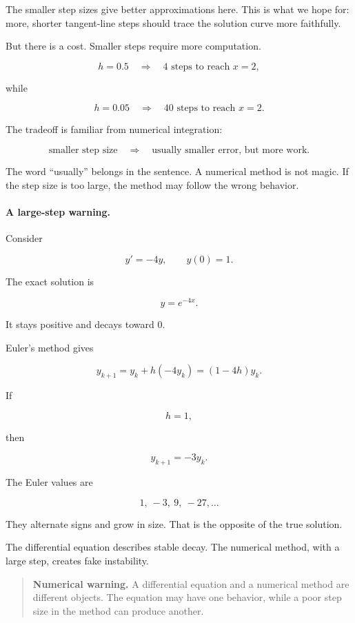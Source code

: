 The smaller step sizes give better approximations here.  This is what we hope for:
more, shorter tangent-line steps should trace the solution curve more faithfully.

But there is a cost.  Smaller steps require more computation.

\[
h=0.5
\quad\Longrightarrow\quad
4\text{ steps to reach }x=2,
\]

while

\[
h=0.05
\quad\Longrightarrow\quad
40\text{ steps to reach }x=2.
\]

The tradeoff is familiar from numerical integration:

\[
\text{smaller step size}
\quad\Longrightarrow\quad
\text{usually smaller error, but more work}.
\]

The word ``usually'' belongs in the sentence.  A numerical method is not magic.  If the
step size is too large, the method may follow the wrong behavior.

\paragraph{A large-step warning.}
Consider

\[
y'=-4y,
\qquad
y(0)=1.
\]

The exact solution is

\[
y=e^{-4x}.
\]

It stays positive and decays toward \(0\).

Euler's method gives

\[
y_{k+1}=y_k+h(-4y_k)=(1-4h)y_k.
\]

If

\[
h=1,
\]

then

\[
y_{k+1}=-3y_k.
\]

The Euler values are

\[
1,\ -3,\ 9,\ -27,\ldots
\]

They alternate signs and grow in size.  That is the opposite of the true solution.

The differential equation describes stable decay.  The numerical method, with a large
step, creates fake instability.

\begin{quote}
\textbf{Numerical warning.}
A differential equation and a numerical method are different objects.  The equation may
have one behavior, while a poor step size in the method can produce another.
\end{quote}

